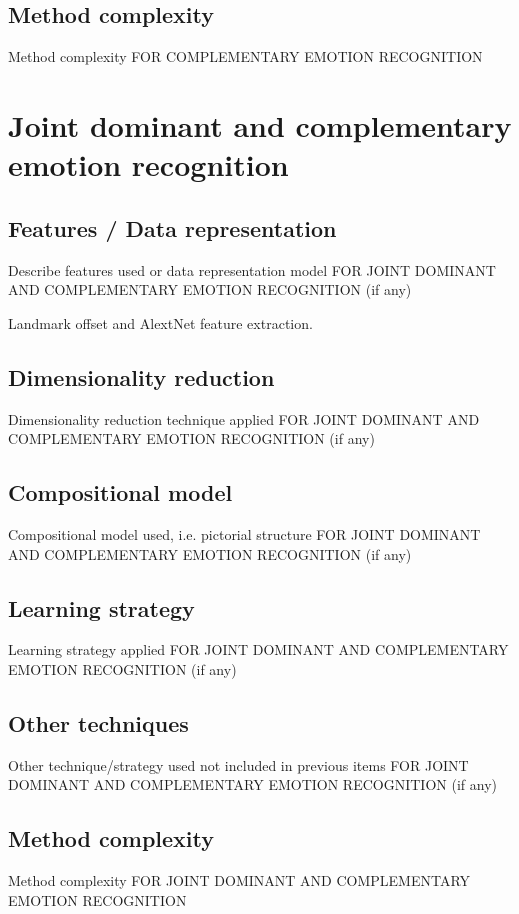 \documentclass{article}
\begin{document}
\subsection{Method complexity}
Method complexity FOR COMPLEMENTARY EMOTION RECOGNITION


\section{Joint dominant and complementary emotion recognition}
\subsection{Features / Data representation}
Describe features used or data representation model FOR JOINT DOMINANT AND COMPLEMENTARY EMOTION RECOGNITION (if any)

Landmark offset and AlextNet feature extraction.
\subsection{Dimensionality reduction}
Dimensionality reduction technique applied FOR JOINT DOMINANT AND COMPLEMENTARY EMOTION RECOGNITION (if any)

\subsection{Compositional model}
Compositional model used, i.e. pictorial structure FOR JOINT DOMINANT AND COMPLEMENTARY EMOTION RECOGNITION (if any)

\subsection{Learning strategy}
Learning strategy applied FOR JOINT DOMINANT AND COMPLEMENTARY EMOTION RECOGNITION (if any)

\subsection{Other techniques}
Other technique/strategy used not included in previous items FOR JOINT DOMINANT AND COMPLEMENTARY EMOTION RECOGNITION (if any)

\subsection{Method complexity}
Method complexity FOR JOINT DOMINANT AND COMPLEMENTARY EMOTION RECOGNITION
\end{document}
